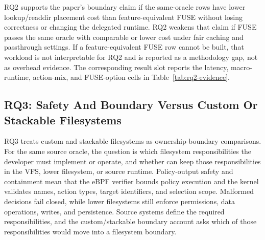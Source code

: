 RQ2 supports the paper's boundary claim if the same-oracle \namei
rows have lower lookup/readdir placement cost than feature-equivalent FUSE
without losing correctness or changing the delegated runtime. RQ2 weakens that
claim if FUSE passes the same oracle with comparable or lower cost under fair
caching and passthrough settings. If a feature-equivalent FUSE row cannot be
built, that workload is not interpretable for RQ2 and is reported as a
methodology gap, not as overhead evidence. The corresponding result slot reports
the latency,
macro-runtime, action-mix, and FUSE-option cells in
Table~\ref{tab:rq2-evidence}.

\subsection{RQ3: Safety And Boundary Versus Custom Or Stackable Filesystems}

RQ3 treats custom and stackable filesystems as ownership-boundary comparisons.
For the same source oracle, the question is which filesystem responsibilities
the developer must implement or operate, and whether \namei can keep those
responsibilities in the VFS, lower filesystem, or source runtime. Policy-output
safety and containment mean that the eBPF verifier bounds policy execution and
the kernel validates names, action types, target identifiers, and selection
scope. Malformed decisions fail closed, while lower filesystems still enforce
permissions, data operations, writes, and persistence. Source systems define the
required responsibilities, and the custom/stackable boundary account asks which
of those responsibilities would move into a filesystem boundary.

